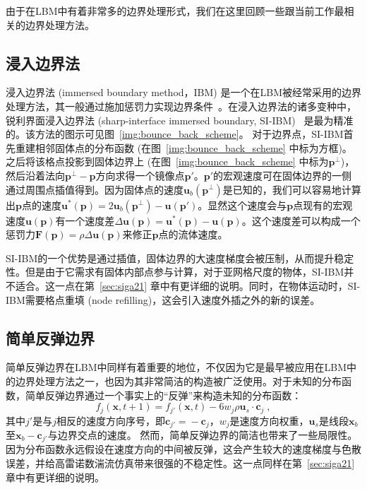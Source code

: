 由于在LBM中有着非常多的边界处理形式，我们在这里回顾一些跟当前工作最相关的边界处理方法。

\subsection{浸入边界法}
浸入边界法 (immersed boundary method，IBM) 是一个在LBM被经常采用的边界处理方法，其一般通过施加惩罚力实现边界条件~\cite{patel2018diffuse,mittal-2008,Li-2020}。在浸入边界法的诸多变种中，锐利界面浸入边界法 (sharp-interface immersed boundary, SI-IBM)~\cite{mittal-2008} 是最为精准的。该方法的图示可见图~\ref{img:bounce_back_scheme}。
对于边界点，SI-IBM首先重建相邻固体点的分布函数 (在图~\ref{img:bounce_back_scheme} 中标为方框)。之后将该格点投影到固体边界上 (在图~\ref{img:bounce_back_scheme} 中标为$\bm{p}^\perp$)，然后沿着法向$\bm{p}^\perp\!-\!\bm{p}$方向求得一个镜像点$\bm{p}'$。$\bm{p}'$的宏观速度可在固体边界的一侧通过周围点插值得到。因为固体点的速度$\bm{u}_b(\bm{p}^\perp)$是已知的，我们可以容易地计算出$\bm{p}$点的速度$\bm{u}^*(\bm{p}) = 2\bm{u}_b(\bm{p}^\perp) - \bm{u}(\bm{p}')$。显然这个速度会与$\bm{p}$点现有的宏观速度$\bm{u}(\bm{p})$有一个速度差$\Delta\bm{u}(\bm{p}) = \bm{u}^*(\bm{p}) - \bm{u}(\bm{p})$。这个速度差可以构成一个惩罚力$\bm{F}(\bm{p}) = \rho\Delta\bm{u}(\bm{p})$来修正$\bm{p}$点的流体速度。

SI-IBM的一个优势是通过插值，固体边界的大速度梯度会被压制，从而提升稳定性。但是由于它需求有固体内部点参与计算，对于亚网格尺度的物体，SI-IBM并不适合。这一点在第~\ref{sec:siga21} 章中有更详细的说明。同时，在物体运动时，SI-IBM需要格点重填 (node refilling)，这会引入速度外插之外的新的误差。

\subsection{简单反弹边界}
简单反弹边界在LBM中同样有着重要的地位，不仅因为它是最早被应用在LBM中的边界处理方法之一，也因为其非常简洁的构造被广泛使用。对于未知的分布函数，简单反弹边界通过一个事实上的“反弹”来构造未知的分布函数：
\begin{equation}\label{eq:bounce-back}
f_{j}(\bm{x},t+1) = f_{j'}(\bm{x},t) - 6 w_{j}\rho\bm{u}_s \cdot \bm{c}_{j}\;,
\end{equation}
其中$j'$是与$j$相反的速度方向序号，即$\bm{c}_{j'}\!=\!-\bm{c}_j$，$w_j$是速度方向权重，$\bm{u}_s$是线段$\bm{x}_b$至$\bm{x}_b-\bm{c}_{j'}$与边界交点的速度。
然而，简单反弹边界的简洁也带来了一些局限性。因为分布函数永远假设在速度方向的中间被反弹，这会产生较大的速度梯度与色散误差，并给高雷诺数湍流仿真带来很强的不稳定性。这一点同样在第~\ref{sec:siga21} 章中有更详细的说明。

